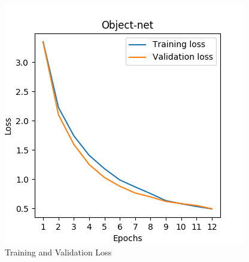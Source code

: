 \begin{figure}[htp]
\begin{center}
        \includegraphics[scale=0.5]{images/loss.png}
        \caption{Training and Validation Loss}
        \label{fig:loss}
\end{center}
\end{figure}